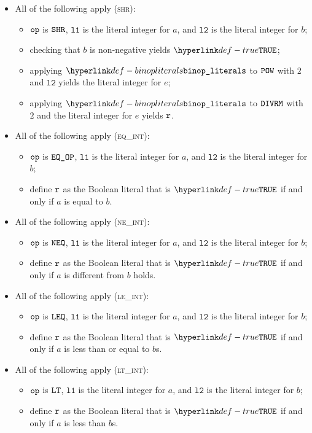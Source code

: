 \documentclass{book}
\newcommand\ProseOrTypeError[0]{\ProseTerminateAs{\TypeErrorConfig}}
\newcommand\vlone[0]{\texttt{l1}}
\newcommand\vltwo[0]{\texttt{l2}}
\begin{document}
\begin{itemize}
  \item All of the following apply (\textsc{shr}):
  \begin{itemize}
    \item $\texttt{op}$ is $\texttt{SHR}$, $\vlone$ is the literal integer for $a$, and $\vltwo$ is the literal integer for $b$;
    \item checking that $b$ is non-negative yields $\True$\ProseOrTypeError;
    \item applying $\binopliterals$ to $\texttt{POW}$ with $2$ and $\vltwo$ yields the literal integer for $e$;
    \item applying $\binopliterals$ to $\texttt{DIVRM}$ with $2$ and the literal integer for $e$ yields $\texttt{r}$.
  \end{itemize}

  \item All of the following apply (\textsc{eq\_int}):
  \begin{itemize}
    \item $\texttt{op}$ is $\texttt{EQ\_OP}$, $\vlone$ is the literal integer for $a$, and $\vltwo$ is the literal integer for $b$;
    \item define $\texttt{r}$ as the Boolean literal that is $\True$ if and only if $a$ is equal to $b$.
  \end{itemize}

  \item All of the following apply (\textsc{ne\_int}):
  \begin{itemize}
    \item $\texttt{op}$ is $\texttt{NEQ}$, $\vlone$ is the literal integer for $a$, and $\vltwo$ is the literal integer for $b$;
    \item define $\texttt{r}$ as the Boolean literal that is $\True$ if and only if $a$ is different from $b$ holds.
  \end{itemize}

  \item All of the following apply (\textsc{le\_int}):
  \begin{itemize}
    \item $\texttt{op}$ is $\texttt{LEQ}$, $\vlone$ is the literal integer for $a$, and $\vltwo$ is the literal integer for $b$;
    \item define $\texttt{r}$ as the Boolean literal that is $\True$ if and only if $a$ is less than or equal to $b$s.
  \end{itemize}

  \item All of the following apply (\textsc{lt\_int}):
  \begin{itemize}
    \item $\texttt{op}$ is $\texttt{LT}$, $\vlone$ is the literal integer for $a$, and $\vltwo$ is the literal integer for $b$;
    \item define $\texttt{r}$ as the Boolean literal that is $\True$ if and only if $a$ is less than $b$s.
  \end{itemize}


\end{itemize}
\end{document}
